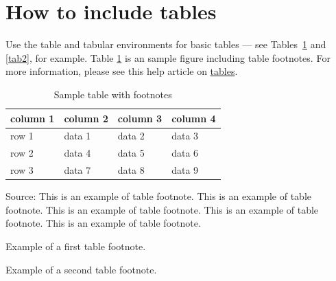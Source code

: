 \section{How to include tables}\label{sec5}

Use the table and tabular environments for basic tables --- see Tables~\ref{tab1} and \ref{tab2}, for example. Table \ref{tab1} is an sample figure including table footnotes. For more information, please see this help article on \href{https://www.overleaf.com/learn/latex/tables}{tables}. 

\begin{table}[!ht]
\caption{Sample table with footnotes\label{tab1}}
\begin{threeparttable}
\begin{tabular*}{\columnwidth}{@{\extracolsep\fill}llll@{\extracolsep\fill}}
\toprule
column 1 & column 2 & column 3 & column 4\\
\midrule
row 1 & data 1 & data 2 & data 3 \\
row 2 & data 4 & data 5\tnote{1} & data 6 \\
row 3 & data 7 & data 8 & data 9\tnote{2} \\
\bottomrule
\end{tabular*}
\begin{tablenotes}
\item Source: This is an example of table footnote. This is an example of table footnote. This is an example of table footnote. This is an example of table footnote. This is an example of table footnote.
\item[1] Example of a first table footnote.
\item[2] Example of a second table footnote.
\end{tablenotes}
\end{threeparttable}
\end{table}

